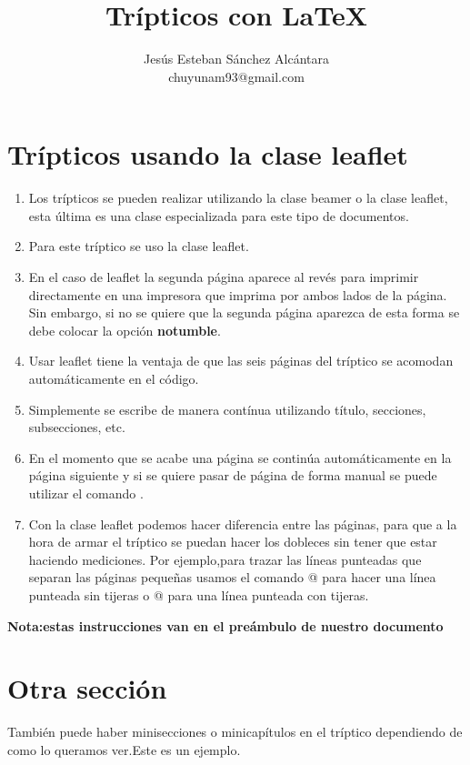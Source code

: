 \documentclass[10pt, notumble, letterpaper]{leaflet}
\title{\textbf{Trípticos con \LaTeX}}
\author{Jesús Esteban Sánchez Alcántara\\chuyunam93@gmail.com}
\begin{document}
\renewcommand{\contentsname}{Temas en general}
\pagecolor{yellow}
\maketitle
\tableofcontents
\listoffigures
\listoftables


\newpage
\pagecolor{white}%
\section{Trípticos usando la clase leaflet}
\begin{enumerate}
	\item Los trípticos se pueden realizar utilizando la clase beamer o la clase
	leaflet, esta última es una clase especializada para este tipo de documentos.
	\item Para este tríptico se uso la clase leaflet.
	\item En el caso de leaflet la segunda página aparece al revés para imprimir directamente en una impresora 	que imprima por ambos lados de la página. Sin embargo, si no se quiere que la segunda página aparezca de 		esta forma se debe colocar la opción \textbf{notumble}.
	\item Usar leaflet tiene la ventaja de que las seis páginas del tríptico se acomodan automáticamente en el 	código.
	\item Simplemente se escribe de manera contínua utilizando título, secciones, subsecciones, etc.
	\item En el momento que se acabe una página se continúa automáticamente en la página siguiente y si se 			quiere pasar de página de forma manual se puede utilizar el comando \verb@\newpage@.
	\item Con la clase leaflet podemos hacer diferencia entre las páginas, para que a la hora de armar el 			tríptico se puedan hacer los dobleces sin tener que estar haciendo mediciones. Por ejemplo,para trazar las 	líneas punteadas que separan las páginas pequeñas usamos el comando	\verb@{}@ para hacer una 			línea punteada sin tijeras o \verb@{}@ para una línea punteada con tijeras.
\end{enumerate}
\textbf{Nota:estas instrucciones van en el preámbulo de nuestro documento}

\section{Otra sección}
También puede haber minisecciones o minicapítulos en el tríptico dependiendo de como lo queramos ver.Este es un ejemplo.
\end{document}
